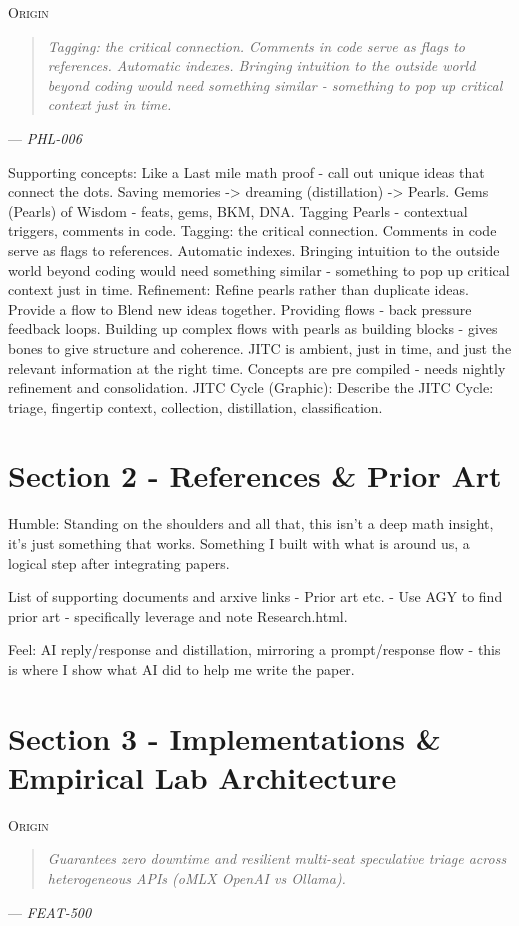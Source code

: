 \documentclass[11pt]{article}
\newcommand{\originquote}[1]{%
  \begin{quote}
  \textit{#1}
  \end{quote}
}
\newcommand{\originmark}{%
  \textsc{Origin}\enspace
}
\begin{document}
\noindent\originmark
\originquote{Tagging: the critical connection. Comments in code serve as flags to references. Automatic indexes. Bringing intuition to the outside world beyond coding would need something similar - something to pop up critical context just in time.}
\hfill --- \textit{PHL-006}

Supporting concepts: Like a Last mile math proof - call out unique ideas that connect the dots. Saving memories -> dreaming (distillation) -> Pearls. Gems (Pearls) of Wisdom - feats, gems, BKM, DNA. Tagging Pearls - contextual triggers, comments in code. Tagging: the critical connection. Comments in code serve as flags to references. Automatic indexes. Bringing intuition to the outside world beyond coding would need something similar - something to pop up critical context just in time. Refinement: Refine pearls rather than duplicate ideas. Provide a flow to Blend new ideas together. Providing flows - back pressure feedback loops. Building up complex flows with pearls as building blocks - gives bones to give structure and coherence. JITC is ambient, just in time, and just the relevant information at the right time. Concepts are pre compiled - needs nightly refinement and consolidation. JITC Cycle (Graphic): Describe the JITC Cycle: triage, fingertip context, collection, distillation, classification. \cite{PHL006} \cite{BKM046}


\section{Section 2 - References \& Prior Art}
Humble: Standing on the shoulders and all that, this isn't a deep math insight, it’s just something that works. Something I built with what is around us, a logical step after integrating papers. \cite{ARXIV230518290}

List of supporting documents and arxive links - Prior art etc. - Use AGY to find prior art - specifically leverage and note Research.html. \cite{ARXIV240103462}

Feel: AI reply/response and distillation, mirroring a prompt/response flow - this is where I show what AI did to help me write the paper. \cite{PHL029} \cite{PHL030}


\section{Section 3 - Implementations \& Empirical Lab Architecture}
\noindent\originmark
\originquote{Guarantees zero downtime and resilient multi-seat speculative triage across heterogeneous APIs (oMLX OpenAI vs Ollama).}
\hfill --- \textit{FEAT-500}
\end{document}
